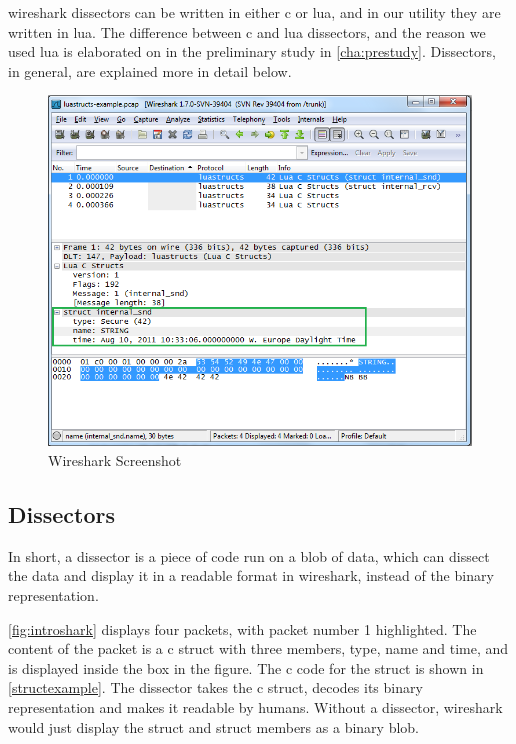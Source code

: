 \Gls{wireshark} \glspl{dissector} can be written in either \Gls{c} or \Gls{lua}, and in our \gls{utility} they are written in \Gls{lua}.
The difference between \Gls{c} and \Gls{lua} \glspl{dissector},
and the reason we used \Gls{lua} is elaborated on in the 
preliminary study in \autoref{cha:prestudy}.
Dissectors, in general, are explained more in detail below.

\begin{figure}[htb]
	\includegraphics[width=\textwidth]{./planning/img/wireshark_example}
	\caption{Wireshark Screenshot\label{fig:introshark}}
\end{figure}

\subsection{Dissectors}
In short, a \gls{dissector} is a piece of code run on a blob of data, which can dissect the
data and display it in a readable format in \Gls{wireshark}, instead of the \gls{binary} representation.

\autoref{fig:introshark} displays four \glspl{packet}, with \gls{packet} number 1 highlighted.
The content of the \gls{packet} is a \Gls{c} \gls{struct} with three \glspl{member}, type, name and time, and is displayed inside the box in the figure.
The \Gls{c} code for the \gls{struct} is shown in \autoref{structexample}.
The \gls{dissector} takes the \Gls{c} \gls{struct}, decodes its \gls{binary} representation and makes it readable by humans.
Without a \gls{dissector}, \Gls{wireshark} would just display the \gls{struct} and \gls{struct} \glspl{member} as a \gls{binary} blob.

